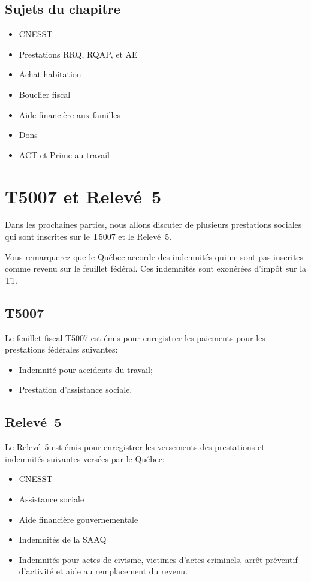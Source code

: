 \subsection{Sujets du chapitre}
\begin{itemize}
	\item CNESST
	\item Prestations RRQ, RQAP, et AE
	\item Achat habitation
	\item Bouclier fiscal
	\item Aide financière aux familles
	\item Dons
	\item ACT et Prime au travail
\end{itemize}



\section{T5007 et Relevé~5}
\begin{intro}
	Dans les prochaines parties, nous allons discuter de plusieurs prestations sociales qui sont inscrites sur le T5007 et le Relevé~5.
	
	Vous remarquerez que le Québec accorde des indemnités qui ne sont pas inscrites comme revenu sur le feuillet fédéral. Ces indemnités sont exonérées d'impôt sur la T1.
\end{intro}


\subsection{T5007}
Le feuillet fiscal \href{https://www.canada.ca/fr/agence-revenu/services/formulaires-publications/formulaires/t5007.html}{T5007} est émis pour enregistrer les paiements pour les prestations fédérales suivantes:
\begin{itemize}
	\item Indemnité pour accidents du travail;
	\item Prestation d'assistance sociale.
\end{itemize}


\subsection{Relevé~5}
Le \href{https://www.revenuquebec.ca/fr/services-en-ligne/formulaires-et-publications/details-courant/rl-5/}{Relevé~5} est émis pour enregistrer les versements des prestations et indemnités suivantes versées par le Québec: 
\begin{itemize}
	\item CNESST
	\item Assistance sociale
	\item Aide financière gouvernementale
	\item Indemnités de la SAAQ
	\item Indemnités pour actes de civisme, victimes d'actes criminels, arrêt préventif d'activité et aide au remplacement du revenu.
\end{itemize}



